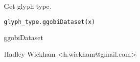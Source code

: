 \begin{Description}\relax
Get glyph type.
\end{Description}
\begin{Usage}
\begin{verbatim}glyph_type.ggobiDataset(x)\end{verbatim}
\end{Usage}
\begin{Arguments}
\begin{ldescription}
\item[\code{x}] ggobiDataset
\end{ldescription}
\end{Arguments}
\begin{Details}\relax
\end{Details}
\begin{Author}\relax
Hadley Wickham <h.wickham@gmail.com>
\end{Author}
\begin{SeeAlso}\relax
{}
\end{SeeAlso}
\begin{Examples}
\begin{ExampleCode}\end{ExampleCode}
\end{Examples}

